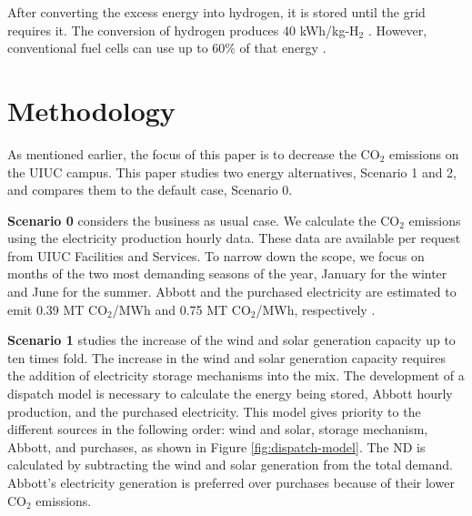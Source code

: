 \documentclass{anstrans}
\begin{document}
After converting the excess energy into hydrogen, it is stored until the grid requires it.
The conversion of hydrogen produces 40 kWh/kg-H$_2$ \cite{ursua_hydrogen_2012}.
However, conventional fuel cells can use up to 60\% of that energy \cite{doe_energy_fuel_2015}.


\section{Methodology}

As mentioned earlier, the focus of this paper is to decrease the CO$_2$ emissions on the UIUC campus.
This paper studies two energy alternatives, Scenario 1 and 2, and compares them to the default case, Scenario 0.

\textbf{Scenario 0} considers the business as usual case.
We calculate the CO$_2$ emissions using the electricity production hourly data.
These data are available per request from UIUC Facilities and Services.
To narrow down the scope, we focus on months of the two most demanding seasons of the year, January for the winter and June for the summer.
Abbott and the purchased electricity are estimated to emit 0.39 MT CO$_2$/MWh and 0.75 MT CO$_2$/MWh, respectively \cite{isee_illinois_2015, isee_illinois_2020}.

\textbf{Scenario 1} studies the increase of the wind and solar generation capacity up to ten times fold.
The increase in the wind and solar generation capacity requires the addition of electricity storage mechanisms into the mix.
The development of a dispatch model is necessary to calculate the energy being stored, Abbott hourly production, and the purchased electricity.
This model gives priority to the different sources in the following order: wind and solar, storage mechanism, Abbott, and purchases, as shown in Figure \ref{fig:dispatch-model}.
The \gls{ND} is calculated by subtracting the wind and solar generation from the total demand.
Abbott’s electricity generation is preferred over purchases because of their lower CO$_2$ emissions.
\end{document}
